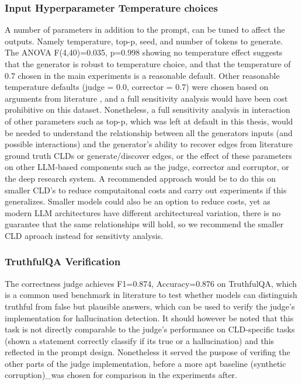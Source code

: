 \subsubsection{Input Hyperparameter Temperature choices}
A number of parameters in addition to the prompt, can be tuned to affect the outputs. Namely temperature, top-p, seed, and number of tokens to generate.
The ANOVA F(4,40)=0.035, p=0.998 showing no temperature effect suggests that the generator is robust to temperature choice, and that the temperature of 0.7 chosen in the main experiments is a reasonable default.
Other reasonable temperature defaults (judge = 0.0, corrector = 0.7) were chosen based on arguments from literature \citep{liu2023gevalnlgevaluationusing, zheng2024judging}, and a full sensitivity analysis would have been cost prohibitive on this dataset.
Nonetheless, a full sensitivity analysis in interaction of other parameters such as top-p, which was left at default in this thesis, would be needed to understand the relationship between all the generators inputs (and possible interactions) and the generator's ability to recover edges from literature ground truth CLDs or generate/discover edges, or the effect of these parameters on other LLM-based components such as the judge, corrector and corruptor, or the deep research system. A recommended approach would be to do this on smaller CLD's to reduce computaitonal costs and carry out experiments if this generalizes. Smaller models could also be an option to reduce costs, yet as modern LLM architectures have different architectureal variation, there is no guarantee that the same relationships will hold, so we recommend the smaller CLD aproach instead for sensitivty analysis.

\subsubsection{TruthfulQA Verification}
The correctness judge achieves F1=0.874, Accuracy=0.876 on TruthfulQA, which is a common used benchmark in literature to test whether models can distinguish truthful from false but plausible answers, which can be used to verify the judge's implementation for hallucination detection. It should however be noted that this task is not directly comparable to the judge's performance on CLD-specific tasks (shown a statement correctly classify if its true or a hallucination) and this reflected in the prompt design. Nonetheless it served the puspose of verifing the other parts of the judge implementation, before a more apt baseline (synthetic corruption)_was chosen for comparison in the experiments after.

